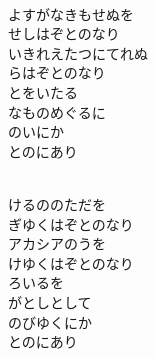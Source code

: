\documentclass[10pt,b5j]{tarticle} %
\begin{document}
\vspace{1.5em} %
\newcommand{\linespace}{0.5em} %
\newcommand{\blocksize}{0.5\hsize} %
\newcommand{\itemmargin}{3em} %
\begin{enumerate} %
    \setlength{\itemindent}{\itemmargin} %
    \begin{minipage}[c]{\blocksize}
    
        \vspace{\linespace}
        \item~\\
        よすがなきもせぬを\\
        せしはぞとのなり\\
        いきれえたつにてれぬ\\
        らはぞとのなり\\
        とをいたる\\
        なものめぐるに\\
        のいにか\\
        とのにあり
        
    \end{minipage}
    \begin{minipage}[c]{\blocksize}
        
        \vspace{\linespace}
        \item~\\
        けるののただを\\
        ぎゆくはぞとのなり\\
        アカシアのうを\\
        けゆくはぞとのなり\\
        ろいるを\\
        がとしとして\\
        のびゆくにか\\
        とのにあり
        

\end{minipage}
\end{enumerate}
\end{document}
